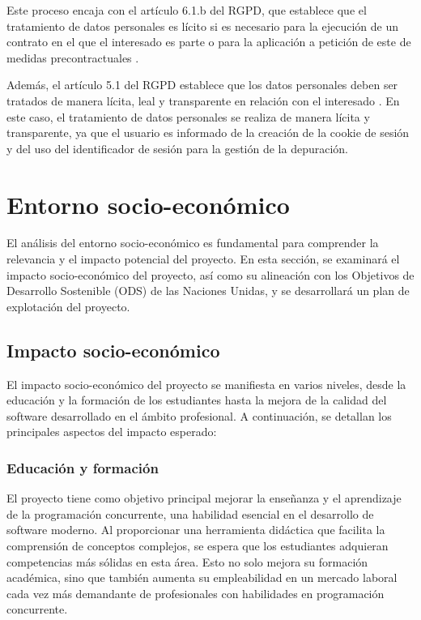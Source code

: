 Este proceso encaja con el artículo 6.1.b del RGPD, que establece que el tratamiento de datos personales es lícito si es necesario para la ejecución de un contrato en el que el interesado es parte o para la aplicación a petición de este de medidas precontractuales \cite{rgpd_art6}. 

Además, el artículo 5.1 del RGPD establece que los datos personales deben ser tratados de manera lícita, leal y transparente en relación con el interesado \cite{rgpd_art5}. En este caso, el tratamiento de datos personales se realiza de manera lícita y transparente, ya que el usuario es informado de la creación de la cookie de sesión y del uso del identificador de sesión para la gestión de la depuración.

\section{Entorno socio-económico}\label{sec:entorno-socio-economico}

El análisis del entorno socio-económico es fundamental para comprender la relevancia y el impacto potencial del proyecto. En esta sección, se examinará el impacto socio-económico del proyecto, así como su alineación con los Objetivos de Desarrollo Sostenible (ODS) de las Naciones Unidas, y se desarrollará un plan de explotación del proyecto. 

\subsection{Impacto socio-económico}\label{subsec:impacto-socio-economico}
El impacto socio-económico del proyecto se manifiesta en varios niveles, desde la educación y la formación de los estudiantes hasta la mejora de la calidad del software desarrollado en el ámbito profesional. A continuación, se detallan los principales aspectos del impacto esperado:

\subsubsection{Educación y formación}
El proyecto tiene como objetivo principal mejorar la enseñanza y el aprendizaje de la programación concurrente, una habilidad esencial en el desarrollo de software moderno. Al proporcionar una herramienta didáctica que facilita la comprensión de conceptos complejos, se espera que los estudiantes adquieran competencias más sólidas en esta área. Esto no solo mejora su formación académica, sino que también aumenta su empleabilidad en un mercado laboral cada vez más demandante de profesionales con habilidades en programación concurrente.

